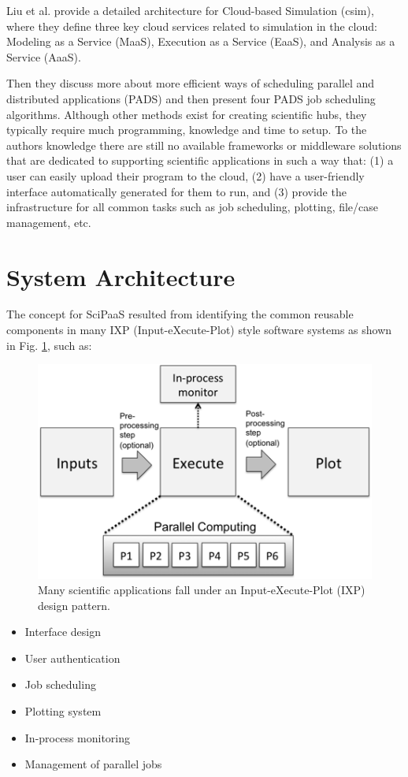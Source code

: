 \documentclass[10pt,reprint]{socc14}
\begin{document}
Liu et al. \cite{liu12} provide a detailed architecture for Cloud-based Simulation (csim), where they define three key cloud services related to simulation in the cloud: Modeling as a Service (MaaS), Execution as a Service (EaaS), and Analysis as a Service (AaaS).

Then they discuss more about more efficient ways of scheduling parallel and distributed applications (PADS) and then present four PADS job scheduling algorithms.
Although other methods exist for creating scientific hubs, they typically require much programming, knowledge and time to setup.  To the authors knowledge there are still no available frameworks or middleware solutions that are dedicated to supporting scientific applications in such a way that: (1) a user can easily upload their program to the cloud, (2) have a user-friendly interface automatically generated for them to run, and (3) provide the infrastructure for all common tasks such as job scheduling, plotting, file/case management, etc.

\section{System Architecture}

The concept for SciPaaS resulted from identifying the common reusable components in many IXP (Input-eXecute-Plot) style software systems as shown in Fig. \ref{ixp}, such as:

\begin{figure}[t]
\centering
\includegraphics[natwidth=450,natheight=289]{figs/ixp.png}
\caption{Many scientific applications fall under an Input-eXecute-Plot (IXP) design pattern. \label{ixp}}
\end{figure}

\begin{itemize}
\item Interface design
\item User authentication
\item Job scheduling
\item Plotting system
\item In-process monitoring
\item Management of parallel jobs
\end{itemize}
\end{document}
